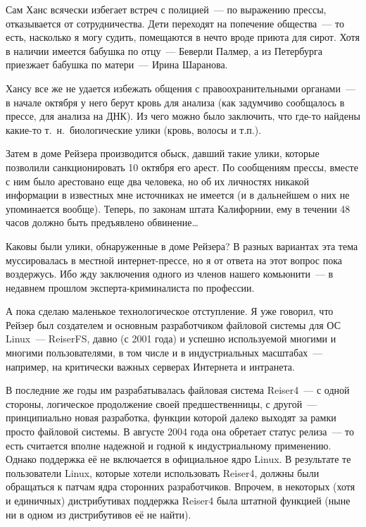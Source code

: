 Сам Ханс всячески избегает встреч с полицией~--- по выражению прессы, отказывается от сотрудничества. Дети переходят на попечение общества~--- то есть, насколько я могу судить, помещаются в нечто вроде приюта для сирот. Хотя в наличии имеется бабушка по отцу~--- Беверли Палмер, а из Петербурга приезжает бабушка по матери~--- Ирина Шаранова. 

Хансу все же не удается избежать общения с правоохранительными органами~--- в начале октября у него берут кровь для анализа (как задумчиво сообщалось в прессе, для анализа на ДНК). Из чего можно было заключить, что где-то найдены какие-то т.~н.~биологические улики (кровь, волосы и т.п.). 

Затем в доме Рейзера производится обыск, давший такие улики, которые позволили санкционировать 10 октября его арест. По сообщениям прессы, вместе с ним было арестовано еще два человека, но об их личностях никакой информации в известных мне источниках не имеется (и в дальнейшем о них не упоминается вообще). Теперь, по законам штата Калифорнии, ему в течении 48 часов должно быть предъявлено обвинение\dots 

Каковы были улики, обнаруженные в доме Рейзера? В разных вариантах эта тема муссировалась в местной интернет-прессе, но я от ответа на этот вопрос пока воздержусь. Ибо жду заключения одного из членов нашего комьюнити~--- в недавнем прошлом эксперта-криминалиста по профессии. 

А пока сделаю маленькое технологическое отступление. Я уже говорил, что Рейзер был создателем и основным разработчиком файловой системы для ОС Linux~--- ReiserFS, давно (с 2001 года) и успешно используемой многими и многими пользователями, в том числе и в индустриальных масштабах~--- например, на критически важных серверах Интернета и интранета. 

В последние же годы им разрабатывалась файловая система Reiser4~--- с одной стороны, логическое продолжение своей предшественницы, с другой~--- принципиально новая разработка, функции которой далеко выходят за рамки просто файловой системы. В августе 2004 года она обретает статус релиза~--- то есть считается вполне надежной и годной к индустриальному применению. Однако поддержка её не включается в официальное ядро Linux. В результате те пользователи Linux, которые хотели использовать Reiser4, должны были обращаться к патчам ядра сторонних разработчиков. Впрочем, в некоторых (хотя и единичных) дистрибутивах поддержка Reiser4 была штатной функцией (ныне ни в одном из дистрибутивов её не найти). 

